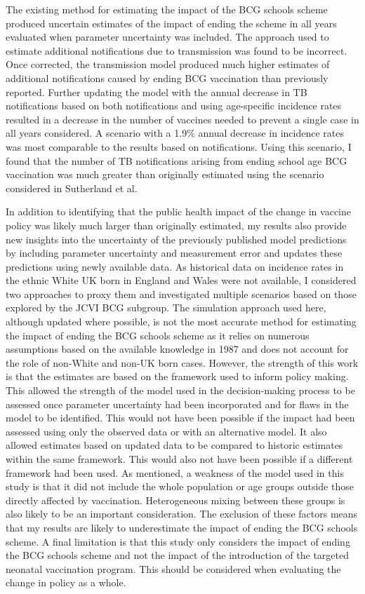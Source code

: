 \documentclass[11pt,twoside]{bristolthesis}
\begin{document}
  The existing method for estimating the impact of the BCG schools scheme produced uncertain estimates of the impact of ending the scheme in all years evaluated when parameter uncertainty was included. The approach used to estimate additional notifications due to transmission was found to be incorrect. Once corrected, the transmission model produced much higher estimates of additional notifications caused by ending BCG vaccination than previously reported. Further updating the model with the annual decrease in TB notifications based on both notifications and using age-specific incidence rates resulted in a decrease in the number of vaccines needed to prevent a single case in all years considered. A scenario with a 1.9\% annual decrease in incidence rates was most comparable to the results based on notifications. Using this scenario, I found that the number of TB notifications arising from ending school age BCG vaccination was much greater than originally estimated using the scenario considered in Sutherland et al.
  
  In addition to identifying that the public health impact of the change in vaccine policy was likely much larger than originally estimated, my results also provide new insights into the uncertainty of the previously published model predictions by including parameter uncertainty and measurement error and updates these predictions using newly available data. As historical data on incidence rates in the ethnic White UK born in England and Wales were not available, I considered two approaches to proxy them and investigated multiple scenarios based on those explored by the JCVI BCG subgroup. The simulation approach used here, although updated where possible, is not the most accurate method for estimating the impact of ending the BCG schools scheme as it relies on numerous assumptions based on the available knowledge in 1987 and does not account for the role of non-White and non-UK born cases. However, the strength of this work is that the estimates are based on the framework used to inform policy making. This allowed the strength of the model used in the decision-making process to be assessed once parameter uncertainty had been incorporated and for flaws in the model to be identified. This would not have been possible if the impact had been assessed using only the observed data or with an alternative model. It also allowed estimates based on updated data to be compared to historic estimates within the same framework. This would also not have been possible if a different framework had been used. As mentioned, a weakness of the model used in this study is that it did not include the whole population or age groups outside those directly affected by vaccination. Heterogeneous mixing between these groups is also likely to be an important consideration. The exclusion of these factors means that my results are likely to underestimate the impact of ending the BCG schools scheme. A final limitation is that this study only considers the impact of ending the BCG schools scheme and not the impact of the introduction of the targeted neonatal vaccination program. This should be considered when evaluating the change in policy as a whole.
  
\end{document}
